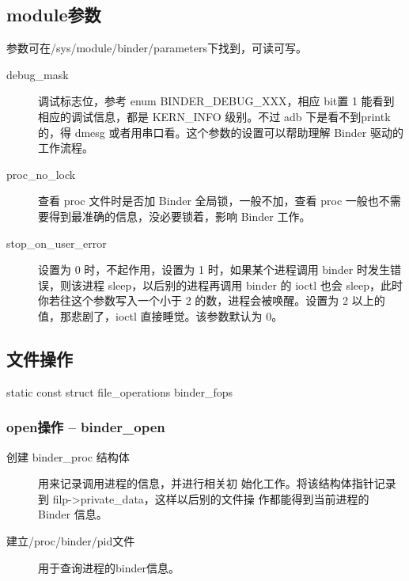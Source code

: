 \documentclass[a4paper,11pt]{article}
\begin{document}
\subsection{module参数} 
参数可在/sys/module/binder/parameters下找到，可读可写。
\begin{description}
    \item[debug_mask]调试标志位，参考 enum BINDER_DEBUG_XXX，相应 bit置 1 能看到相应的调试信息，都是 KERN_INFO 级别。不过 adb 下是看不到printk 的，得 dmesg 或者用串口看。这个参数的设置可以帮助理解 Binder 驱动的工作流程。
    \item[proc_no_lock] 查看 proc 文件时是否加 Binder 全局锁，一般不加，查看 proc 一般也不需要得到最准确的信息，没必要锁着，影响 Binder 工作。
    \item[stop_on_user_error]\label{paramstop} 设置为 0 时，不起作用，设置为 1 时，如果某个进程调用 binder 时发生错误，则该进程 sleep，以后别的进程再调用 binder 的 ioctl 也会 sleep，此时你若往这个参数写入一个小于 2 的数，进程会被唤醒。设置为 2 以上的值，那悲剧了，ioctl 直接睡觉。该参数默认为 0。
\end{description}

\subsection{文件操作}
static const struct file_operations binder_fops

\subsubsection{open操作 -- binder_open}  
\begin{description}
    \item[创建 binder_proc 结构体]用来记录调用进程的信息，并进行相关初
        始化工作。将该结构体指针记录到 filp->private_data，这样以后别的文件操
        作都能得到当前进程的 Binder 信息。
    \item[建立/proc/binder/pid文件] 用于查询进程的binder信息。
\end{description}
\end{document}

